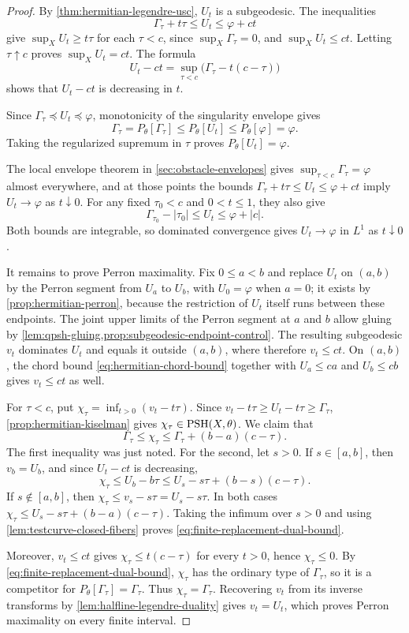 \begin{proof}
By \cref{thm:hermitian-legendre-usc}, $U_t$ is a subgeodesic. The inequalities
\[
 \Gamma_\tau+t\tau\leq U_t\leq\varphi+ct
\]
give $\sup_XU_t\geq t\tau$ for each $\tau<c$, since $\sup_X\Gamma_\tau=0$, and $\sup_XU_t\leq ct$. Letting $\tau\uparrow c$ proves $\sup_XU_t=ct$. The formula
\[
 U_t-ct=\sup_{\tau<c}\bigl(\Gamma_\tau-t(c-\tau)\bigr)
\]
shows that $U_t-ct$ is decreasing in $t$.

Since $\Gamma_\tau\preceq U_t\preceq\varphi$, monotonicity of the singularity envelope gives
\[
 \Gamma_\tau=P_\theta[\Gamma_\tau]\leq P_\theta[U_t]
 \leq P_\theta[\varphi]=\varphi.
\]
Taking the regularized supremum in $\tau$ proves $P_\theta[U_t]=\varphi$.

The local envelope theorem in \cref{sec:obstacle-envelopes} gives $\sup_{\tau<c}\Gamma_\tau=\varphi$ almost everywhere, and at those points the bounds $\Gamma_\tau+t\tau\leq U_t\leq\varphi+ct$ imply $U_t\to\varphi$ as $t\downarrow0$. For any fixed $\tau_0<c$ and $0<t\leq1$, they also give
\[
 \Gamma_{\tau_0}-|\tau_0|\leq U_t\leq\varphi+|c|.
\]
Both bounds are integrable, so dominated convergence gives $U_t\to\varphi$ in $L^1$ as $t\downarrow0$.

It remains to prove Perron maximality. Fix $0\leq a<b$ and replace $U_t$ on $(a,b)$ by the Perron segment from $U_a$ to $U_b$, with $U_0=\varphi$ when $a=0$; it exists by \cref{prop:hermitian-perron}, because the restriction of $U_t$ itself runs between these endpoints. The joint upper limits of the Perron segment at $a$ and $b$ allow gluing by \cref{lem:qpsh-gluing,prop:subgeodesic-endpoint-control}. The resulting subgeodesic $v_t$ dominates $U_t$ and equals it outside $(a,b)$, where therefore $v_t\leq ct$. On $(a,b)$, the chord bound \eqref{eq:hermitian-chord-bound} together with $U_a\leq ca$ and $U_b\leq cb$ gives $v_t\leq ct$ as well.

For $\tau<c$, put $\chi_\tau=\inf_{t>0}(v_t-t\tau)$. Since $v_t-t\tau\geq U_t-t\tau\geq\Gamma_\tau$, \cref{prop:hermitian-kiselman} gives $\chi_\tau\in\mathrm{PSH}(X,\theta)$. We claim that
\begin{equation}\label{eq:finite-replacement-dual-bound}
 \Gamma_\tau\leq\chi_\tau
 \leq\Gamma_\tau+(b-a)(c-\tau).
\end{equation}
The first inequality was just noted. For the second, let $s>0$. If $s\in[a,b]$, then $v_b=U_b$, and since $U_t-ct$ is decreasing,
\[
 \chi_\tau\leq U_b-b\tau
 \leq U_s-s\tau+(b-s)(c-\tau).
\]
If $s\notin[a,b]$, then $\chi_\tau\leq v_s-s\tau=U_s-s\tau$. In both cases $\chi_\tau\leq U_s-s\tau+(b-a)(c-\tau)$. Taking the infimum over $s>0$ and using \cref{lem:testcurve-closed-fibers} proves \eqref{eq:finite-replacement-dual-bound}.

Moreover, $v_t\leq ct$ gives $\chi_\tau\leq t(c-\tau)$ for every $t>0$, hence $\chi_\tau\leq0$. By \eqref{eq:finite-replacement-dual-bound}, $\chi_\tau$ has the ordinary type of $\Gamma_\tau$, so it is a competitor for $P_\theta[\Gamma_\tau]=\Gamma_\tau$. Thus $\chi_\tau=\Gamma_\tau$. Recovering $v_t$ from its inverse transforms by \cref{lem:halfline-legendre-duality} gives $v_t=U_t$, which proves Perron maximality on every finite interval.
\end{proof}

